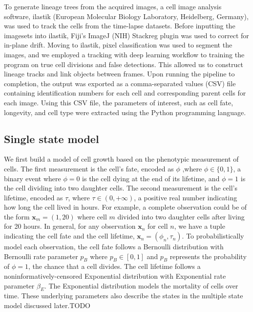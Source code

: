 \documentclass[11pt]{article}
\begin{document}
To generate lineage trees from the acquired images, a cell image
analysis software, ilastik (European Molecular Biology Laboratory,
Heidelberg, Germany), was used to track the cells from the time-lapse
datasets. Before inputting the imagesets into ilastik, Fiji's ImageJ
(NIH) Stackreg plugin was used to correct for in-plane drift. Moving to
ilastik, pixel classification was used to segment the images, and we
employed a tracking with deep learning workflow to training the program
on true cell divisions and false detections. This allowed us to
construct lineage tracks and link objects between frames. Upon running
the pipeline to completion, the output was exported as a comma-separated
values (CSV) file containing identification numbers for each cell and
corresponding parent cells for each image. Using this CSV file, the
parameters of interest, such as cell fate, longevity, and cell type were
extracted using the Python programming language.

\hypertarget{single-state-model}{%
\subsection{Single state model}\label{single-state-model}}

We first build a model of cell growth based on the phenotypic
measurement of cells. The first measurement is the cell's fate, encoded
as \(\phi\) ,where \(\phi\in\{0,1\}\), a binary event where \(\phi=0\)
is the cell dying at the end of its lifetime, and \(\phi=1\) is the cell
dividing into two daughter cells. The second measurement is the cell's
lifetime, encoded as \(\tau\), where \(\tau\in (0, +\infty)\), a
positive real number indicating how long the cell lived in hours. For
example, a complete observation could be of the form
\(\bm{x}_{m} = (1, 20)\) where cell \(m\) divided into two daughter
cells after living for 20 hours. In general, for any observation
\(\bm{x}_{n}\) for cell \(n\), we have a tuple indicating the cell fate
and the cell lifetime, \(\bm{x}_{n}=(\phi_{n}, \tau_{n})\). To
probabilistically model each observation, the cell fate follows a
Bernoulli distribution with Bernoulli rate parameter \(p_{B}\) where
\(p_{B}\in[0,1]\) and \(p_{B}\) represents the probability of
\(\phi=1\), the chance that a cell divides. The cell lifetime follows a
noninformatively-censored Exponential distribution with Exponential rate
parameter \(\beta_{E}\). The Exponential distribution models the
mortality of cells over time. These underlying parameters also describe
the states in the multiple state model discussed later.TODO
\end{document}
